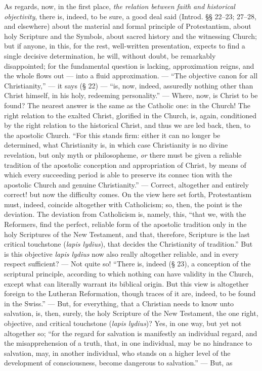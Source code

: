 \documentclass[12pt]{book}
\begin{document}
As regards, now, in the first place, \emph{the relation between faith and historical objectivity}, there is, indeed, to be sure, a good deal said (Introd. §§ 22--23; 27--28, and elsewhere) about the material and formal principle of Protestantism, about holy Scripture and the Symbols, about sacred history and the witnessing Church; but if anyone, in this, for the rest, well-written presentation, expects to find a single decisive determination, he will, without doubt, be remarkably disappointed; for the fundamental question is lacking, approximation reigns, and the whole flows out --- into a fluid approximation. --- ``The objective canon for all Christianity,'' --- it says (§ 22) --- ``is, now, indeed, assuredly nothing other than Christ himself, in his holy, redeeming personality.'' --- Where, now, is Christ to be found? The nearest answer is the same as the Catholic one: in the Church! The right relation to the exalted Christ, glorified in the Church, is, again, conditioned by the right relation to the historical Christ, and thus we are led back, then, to the apostolic Church. ``For this stands firm: either it can no longer be determined, what Christianity is, in which case Christianity is no divine revelation, but only myth or philosopheme, \emph{or} there must be given a reliable tradition of the apostolic conception and appropriation of Christ, by means of which every succeeding period is able to preserve its connec\-%
tion with the apostolic Church and genuine Christianity.'' --- Correct, altogether and entirely correct! but now the difficulty comes. On the view here set forth, Protestantism must, indeed, coincide altogether with Catholicism; so, then, the point is the deviation. The deviation from Catholicism is, namely, this, ``that we, with the Reformers, find the perfect, reliable form of the apostolic tradition only in the holy Scriptures of the New Testament, and that, therefore, Scripture is the last critical touchstone (\textit{lapis lydius}), that decides the Christianity of tradition.'' But is this objective \textit{lapis lydius} now also really altogether reliable, and in every respect sufficient? --- Not quite so! ``There is, indeed (§ 23), a conception of the scriptural principle, according to which nothing can have validity in the Church, except what can literally warrant its biblical origin. But this view is altogether foreign to the Lutheran Reformation, though traces of it are, indeed, to be found in the Swiss.'' --- But, for everything, that a Christian needs to know unto salvation, is, then, surely, the holy Scripture of the New Testament, the one right, objective, and critical touchstone (\textit{lapis lydius})? Yes, in one way, but yet not altogether so; ``for the regard for salvation is manifestly an individual regard, and the misapprehension of a truth, that, in one individual, may be no hindrance to salvation, may, in another individual, who stands on a higher level of the development of consciousness, become dangerous to salvation.'' --- But, as
\end{document}
